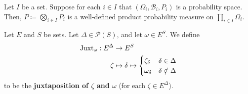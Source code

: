 \begin{definition}
    \label{def:product-probability-measure}
    \leanok

    Let $I$ be a set. Suppose for each $i\in I$ that $(\Omega_i,\mathcal{B}_i,P_i)$ is a probability space. Then, $P\coloneqq\bigotimes_{i\in I}P_i$ is a well-defined product probability measure on $\prod_{i\in I}\Omega_i$.
\end{definition}

\begin{definition}[Juxtaposition]
    \label{def:juxtaposition}
    \leanok

    Let $E$ and $S$ be sets. Let $\Delta\in\mathcal{P}(S)$, and let $\omega\in E^S$. We define
    \begin{align}
        \operatorname{Juxt}_{\omega} : E^\Delta&\to E^S\\
        \zeta&\mapsto \delta\mapsto\begin{cases}
            \zeta_\delta & \delta\in\Delta\\
            \omega_\delta & \delta\notin\Delta
        \end{cases}
    \end{align}
    to be the \textbf{juxtaposition of $\zeta$ and $\omega$} (for each $\zeta\in E^\Delta$).
\end{definition}
